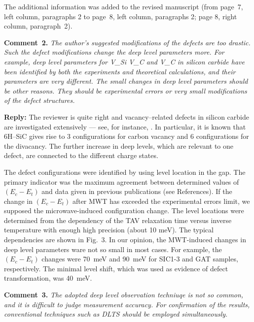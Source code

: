 \documentclass[10pt]{iopart}
\begin{document}
The additional information was added to the revised manuscript
(from page~7, left column, paragraphs 2 to page~8, left column, paragraphs 2;
page 8, right column, paragraph~2).


\vspace{1cm}
\noindent
\textcolor[rgb]{0.00,0.50,1.00}{\textbf{Comment~2.}}
\emph{The author's suggested modifications of the defects are too drastic.
Such the defect modifications change the deep level parameters more.
For example, deep level parameters for V\_Si V\_C and V\_C in silicon carbide have been
identified by both the experiments and theoretical calculations,
and their parameters are very different.
The small changes in deep level parameters should be other reasons.
They should be experimental errors or very small modifications of the defect structures.}

\noindent
\textcolor[rgb]{0.51,0.00,0.00}{\textbf{Reply:}}
The reviewer is quite right and vacancy--related defects in silicon carbide are investigated extensively ---
see, for instance, \cite{6HSiC:Vsi,4HSiC:Vc,6HSiC:VV2019,4HSiC:Vacan,SiC:defEPR,6HSiC:VPAS,4HSiC:VV,SiC:bookCh6,
6HSiC:Vsi2021,6HSiC:vac2021,4HSiC:NV,SiC:NV}.
In particular, it is known \cite{6HSiC:VV2019} that
6H--SiC gives rise to 3 configurations for carbon vacancy
and 6 configurations for the divacancy.
The further increase in deep levels, which are relevant to one defect, are connected to the different charge states.

The defect configurations were identified by using level location in the gap.
The primary indicator was the maximum agreement between determined values of $(E_c-E_t)$ and data given in
previous publications (see References).
If the change in $(E_c-E_t)$ after MWT has exceeded the experimental errors limit,
we supposed the microwave-induced configuration change.
The level locations were determined from the dependency of the TAV relaxation time
versus inverse temperature with enough high precision  (about 10 meV).
The typical dependencies are shown in Fig.~3.
In our opinion, the MWT-induced changes in deep level parameters ware not so small in most cases.
For example, the $(E_c-E_t)$ changes were 70~meV and 90~meV for SIC1-3 and GAT samples, respectively.
The minimal level shift, which was used as evidence of defect transformation, was 40~meV.





\vspace{1cm}
\noindent
\textcolor[rgb]{0.00,0.50,1.00}{\textbf{Comment~3.}}
\emph{The adopted deep level observation techniuqe is not so common,
and it is difficult to judge measurement accuracy.
For confirmation of the results, conventional techniques such as DLTS should be employed simultaneously.}
\end{document}
